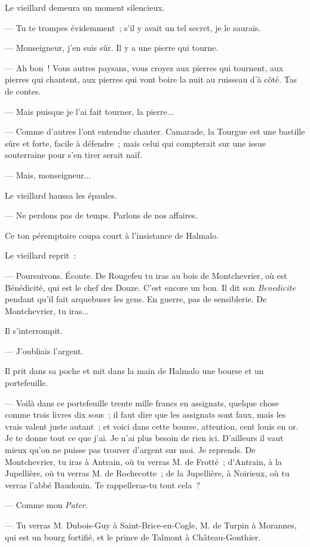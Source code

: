 \documentclass[french,twoside]{book} %
\begin{document}
Le vieillard demeura un moment silencieux.\par
— Tu te trompes évidemment ; s’il y avait un tel secret, je le saurais.\par
— Monseigneur, j’en suis sûr. Il y a une pierre qui tourne.\par
— Ah bon ! Vous autres paysans, vous croyez aux pierres qui tournent, aux pierres qui chantent, aux  pierres qui vont boire la nuit au ruisseau d’à côté. Tas de contes.\par
— Mais puisque je l’ai fait tourner, la pierre...\par
— Comme d’autres l’ont entendue chanter. Camarade, la Tourgue est une bastille sûre et forte, facile à défendre ; mais celui qui compterait sur une issue souterraine pour s’en tirer serait naïf.\par
— Mais, monseigneur...\par
Le vieillard haussa les épaules.\par
— Ne perdons pas de temps. Parlons de nos affaires.\par
Ce ton péremptoire coupa court à l’insistance de Halmalo.\par
Le vieillard reprit :\par
— Poursuivons. Écoute. De Rougefeu tu iras au bois de Montchevrier, où est Bénédicité, qui est le chef des Douze. C’est encore un bon. Il dit son \emph{Benedicite} pendant qu’il fait arquebuser les gens. En guerre, pas de sensiblerie. De Montchevrier, tu iras...\par
Il s’interrompit.\par
— J’oubliais l’argent.\par
Il prit dans sa poche et mit dans la main de Halmalo une bourse et un portefeuille.\par
— Voilà dans ce portefeuille trente mille francs en assignats, quelque chose comme trois livres dix sous ; il faut dire que les assignats sont faux, mais les vrais valent juste autant ; et voici dans cette bourse, attention, cent louis en or. Je te donne tout ce que j’ai. Je n’ai plus besoin de rien ici. D’ailleurs il vaut mieux qu’on ne puisse pas trouver d’argent sur moi. Je reprends. De Montchevrier, tu iras à Antrain,  où tu verras M. de Frotté ; d’Antrain, à la Jupellière, où tu verras M. de Rochecotte ; de la Jupellière, à Noirieux, où tu verras l’abbé Baudouin. Te rappelleras-tu tout cela ?\par
— Comme mon \emph{Pater}.\par
— Tu verras M. Dubois-Guy à Saint-Brice-en-Cogle, M. de Turpin à Morannes, qui est un bourg fortifié, et le prince de Talmont à Château-Gonthier.\par
\end{document}
